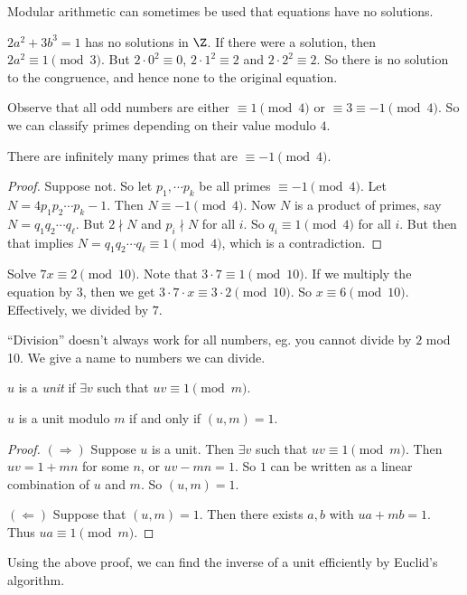 \documentclass[a4paper]{article}
\begin{document}
Modular arithmetic can sometimes be used that equations have no solutions.
\begin{eg}
  $2a^2 + 3b^3 = 1$ has no solutions in $\Z$. If there were a solution, then $2a^2 \equiv 1\pmod 3$. But $2\cdot 0^2 \equiv 0$, $2\cdot 1^2\equiv 2$ and $2\cdot 2^2 \equiv 2$. So there is no solution to the congruence, and hence none to the original equation.
\end{eg}

Observe that all odd numbers are either $\equiv 1\pmod 4$ or $\equiv 3\equiv -1\pmod 4$. So we can classify primes depending on their value modulo $4$.

\begin{thm}
  There are infinitely many primes that are $\equiv -1 \pmod 4$.
\end{thm}

\begin{proof}
  Suppose not. So let $p_1, \cdots p_k$ be all primes $\equiv -1 \pmod 4$. Let $N = 4p_1p_2\cdots p_k - 1$. Then $N\equiv -1\pmod 4$. Now $N$ is a product of primes, say $N= q_1q_2\cdots q_\ell$. But $2\nmid N$ and $p_i\nmid N$ for all $i$. So $q_i \equiv 1\pmod 4$ for all $i$. But then that implies $N = q_1q_2\cdots q_\ell \equiv 1\pmod 4$, which is a contradiction.
\end{proof}

\begin{eg}
  Solve $7x \equiv 2 \pmod {10}$. Note that $3\cdot 7\equiv 1\pmod {10}$. If we multiply the equation by $3$, then we get $3\cdot 7\cdot x \equiv 3\cdot 2\pmod {10}$. So $x\equiv 6\pmod {10}$. Effectively, we divided by $7$.
\end{eg}
``Division'' doesn't always work for all numbers, eg. you cannot divide by $2$ mod 10. We give a name to numbers we can divide.

\begin{defi}
  $u$ is a \emph{unit} if $\exists v$ such that $uv \equiv 1\pmod m$.
\end{defi}

\begin{thm}
  $u$ is a unit modulo $m$ if and only if $(u, m) = 1$.
\end{thm}

\begin{proof}
  $(\Rightarrow)$ Suppose $u$ is a unit. Then $\exists v$ such that $uv \equiv 1\pmod m$. Then $uv = 1 + mn$ for some $n$, or $uv - mn = 1$. So $1$ can be written as a linear combination of $u$ and $m$. So $(u, m) = 1$.

  $(\Leftarrow)$ Suppose that $(u, m) = 1$. Then there exists $a, b$ with $ua + mb = 1$. Thus $ua \equiv 1\pmod m$.
\end{proof}
Using the above proof, we can find the inverse of a unit efficiently by Euclid's algorithm.
\end{document}

